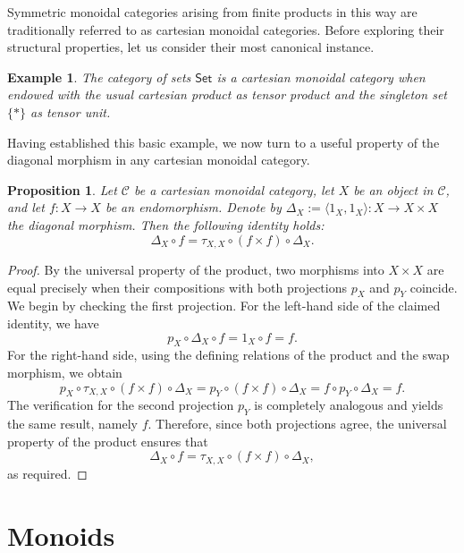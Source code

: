 \documentclass{amsart}
\newcommand{\Set}{\mathsf{Set}}
\newtheorem{proposition}{Proposition}[section]
\newtheorem{example}{Example}[section]
\begin{document}
Symmetric monoidal categories arising from finite products in this way are traditionally referred to as cartesian monoidal categories. Before exploring their structural properties, let us consider their most canonical instance.

\begin{example}\label{ex:set_cartesian}
The category of sets $\Set$ is a cartesian monoidal category when endowed with the usual cartesian product as tensor product and the singleton set $\{ * \}$ as tensor unit.
\end{example}

Having established this basic example, we now turn to a useful property of the diagonal morphism in any cartesian monoidal category.

\begin{proposition}\label{prop:diagonal_naturality}
Let $\mathcal{C}$ be a cartesian monoidal category, let $X$ be an object in $\mathcal{C}$, and let $f \colon X \to X$ be an endomorphism. Denote by $\Delta_X := \langle 1_X, 1_X \rangle \colon X \to X \times X$ the diagonal morphism. Then the following identity holds:
\[
\Delta_X \circ f = \tau_{X,X} \circ (f \times f) \circ \Delta_X.
\]
\end{proposition}

\begin{proof}
By the universal property of the product, two morphisms into $X \times X$ are equal precisely when their compositions with both projections $p_X$ and $p_Y$ coincide. We begin by checking the first projection. For the left-hand side of the claimed identity, we have
\[
p_X \circ \Delta_X \circ f = 1_X \circ f = f.
\]
For the right-hand side, using the defining relations of the product and the swap morphism, we obtain
\[
p_X \circ \tau_{X,X} \circ (f \times f) \circ \Delta_X
= p_Y \circ (f \times f) \circ \Delta_X
= f \circ p_Y \circ \Delta_X
= f.
\]
The verification for the second projection $p_Y$ is completely analogous and yields the same result, namely $f$. Therefore, since both projections agree, the universal property of the product ensures that
\[
\Delta_X \circ f = \tau_{X,X} \circ (f \times f) \circ \Delta_X,
\]
as required.
\end{proof}

\section{Monoids}\label{sec:monoids}
\end{document}
